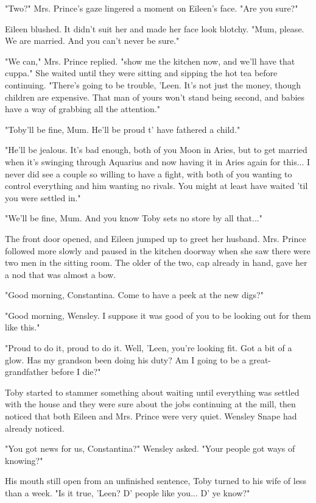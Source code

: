 "Two?" Mrs. Prince's gaze lingered a moment on Eileen's face. "Are you sure?"

Eileen blushed. It didn't suit her and made her face look blotchy. "Mum, please. We are married. And you can't never be sure."

"We can," Mrs. Prince replied. "show me the kitchen now, and we'll have that cuppa." She waited until they were sitting and sipping the hot tea before continuing. "There's going to be trouble, 'Leen. It's not just the money, though children are expensive. That man of yours won't stand being second, and babies have a way of grabbing all the attention."

"Toby'll be fine, Mum. He'll be proud t' have fathered a child."

"He'll be jealous. It's bad enough, both of you Moon in Aries, but to get married when it's swinging through Aquarius and now having it in Aries again for this... I never did see a couple so willing to have a fight, with both of you wanting to control everything and him wanting no rivals. You might at least have waited 'til you were settled in."

"We'll be fine, Mum. And you know Toby sets no store by all that..."

The front door opened, and Eileen jumped up to greet her husband. Mrs. Prince followed more slowly and paused in the kitchen doorway when she saw there were two men in the sitting room. The older of the two, cap already in hand, gave her a nod that was almost a bow.

"Good morning, Constantina. Come to have a peek at the new digs?"

"Good morning, Wensley. I suppose it was good of you to be looking out for them like this."

"Proud to do it, proud to do it. Well, 'Leen, you're looking fit. Got a bit of a glow. Has my grandson been doing his duty? Am I going to be a great-grandfather before I die?"

Toby started to stammer something about waiting until everything was settled with the house and they were sure about the jobs continuing at the mill, then noticed that both Eileen and Mrs. Prince were very quiet. Wensley Snape had already noticed.

"You got news for us, Constantina?" Wensley asked. "Your people got ways of knowing?"

His mouth still open from an unfinished sentence, Toby turned to his wife of less than a week. "Is it true, 'Leen? D' people like you... D' ye know?"

